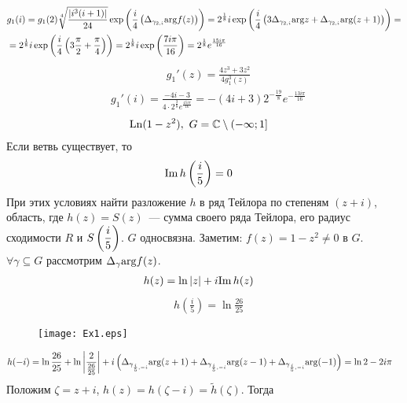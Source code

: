 \begin{align*}
  & g_1(i) = g_1(2) \sqrt[4]{\frac{\left| i^3(i+1) \right|}{24}} \exp \left( \frac{i}{4}\left( \Delta_{\gamma_{2,i}}\mathrm{arg} f(z) \right) \right) = 2^{\frac{1}{8}}i\exp \left( \frac{i}{4} \left( 3\Delta_{\gamma_{2,i}}\mathrm{arg} z + \Delta_{\gamma_{2,i}} \mathrm{arg} (z+1) \right) \right) = \\
  & = 2^{\frac{1}{8}}i\exp \left( \frac{i}{4} \left( 3\frac{\pi}{2} + \frac{\pi}{4} \right) \right) = 2^{\frac{1}{8}}i\exp \left( \frac{7i\pi}{16} \right) =  2^{\frac{1}{8}}e^{\frac{15i\pi}{16}}
\end{align*}
\begin{align*}
  & g_1'(z) = \frac{4z^3+3z^2}{4g_1^3(z)}
\end{align*}
\begin{align*}
  & g_1'(i) = \frac{-4i -3}{4\cdot 2^{\frac{3}{8}}e^{\frac{45i\pi}{16}}} = -(4i+3)2^{-\frac{19}{8}}e^{-\frac{13i\pi}{16}}
\end{align*}
\Example
\begin{align*}
  & \mathrm{Ln} (1-z^2), \ G = \mathbb{C} \setminus (-\infty; 1]
\end{align*}
Если ветвь существует, то
\begin{align*}
  & \mathrm{Im}\, h\left( \frac{i}{5} \right) = 0
\end{align*}
При этих условиях найти разложение $h$ в ряд Тейлора по степеням $(z+i)$,
область, где $h(z) = S(z)$~--- сумма своего ряда Тейлора, его радиус сходимости
$R$ и $S\left( \displaystyle \frac{i}{5} \right)$.
\nonum
$G$ односвязна. Заметим: $f(z) = 1-z^2 \neq 0$ в $G$.
\\
$\forall \gamma \subseteq G$ рассмотрим $\Delta_{\gamma}\mathrm{arg} f(z)$.
\begin{align*}
  & h(z) = \ln \left| z \right| + i \mathrm{Im}\, h(z)
\end{align*}
\begin{align*}
  & h\left( \frac{i}{5} \right) = \ln \frac{26}{25}
\end{align*}
\begin{figure}[h!]
		\centering
		\texttt{[image: Ex1.eps]}
		\label{fig:17.2}
\end{figure}
\begin{align*}
  & h(-i) = \ln \frac{26}{25} + \ln \left| \frac{2}{\frac{26}{25}} \right|+ i\left( \Delta_{\gamma_{\frac{i}{5}, -i}}\mathrm{arg} (z+1) + \Delta_{\gamma_{\frac{i}{5}, -i}}\mathrm{arg} (z-1) + \Delta_{\gamma_{\frac{i}{5}, -i}}\mathrm{arg} (-1) \right) = \ln 2 - 2 i \pi
\end{align*}
Положим $\zeta = z+i$, $h(z) = h(\zeta - i) = \tilde{h}(\zeta)$. Тогда

